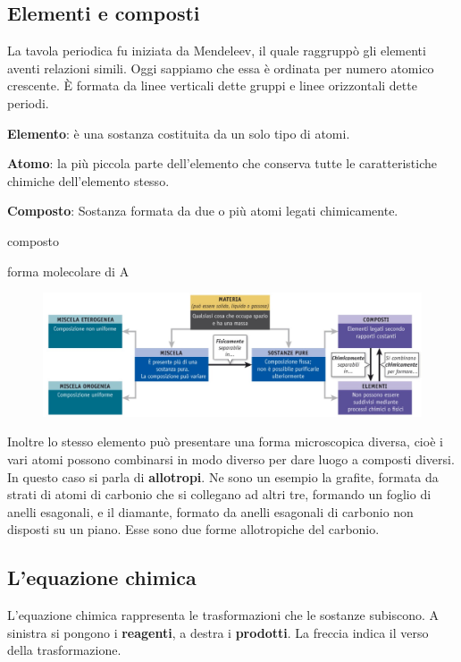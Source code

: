 \subsection{Elementi e composti}
La tavola periodica fu iniziata da Mendeleev, il quale raggruppò gli elementi aventi relazioni simili. Oggi sappiamo che essa è ordinata per numero atomico crescente. È formata da linee verticali dette gruppi e linee orizzontali dette periodi.

\textbf{Elemento}: è una sostanza costituita da un solo tipo di atomi.

\textbf{Atomo}: la più piccola parte dell'elemento che conserva tutte le
caratteristiche chimiche dell'elemento stesso.

\textbf{Composto}: Sostanza formata da due o più atomi legati
chimicamente.

\vspace{0.2cm} composto

\vspace{0.2cm} forma molecolare di A

\begin{figure}[htp]
    \centering
    \includegraphics[width=16cm]{immagini/materia.jpg}
\end{figure}

Inoltre lo stesso elemento può presentare una forma microscopica diversa, cioè i vari atomi possono combinarsi in modo diverso per dare luogo a composti diversi. In questo caso si parla di \textbf{allotropi}. Ne sono un esempio la grafite, formata da strati di atomi di carbonio che si collegano ad altri tre, formando un foglio di anelli esagonali, e il diamante, formato da anelli esagonali di carbonio non disposti su un piano. Esse sono due forme allotropiche del carbonio.
\subsection{L'equazione chimica}

L'equazione chimica rappresenta le trasformazioni che le sostanze subiscono. A sinistra si pongono i \textbf{reagenti}, a destra i \textbf{prodotti}. La freccia indica il verso della trasformazione. 

